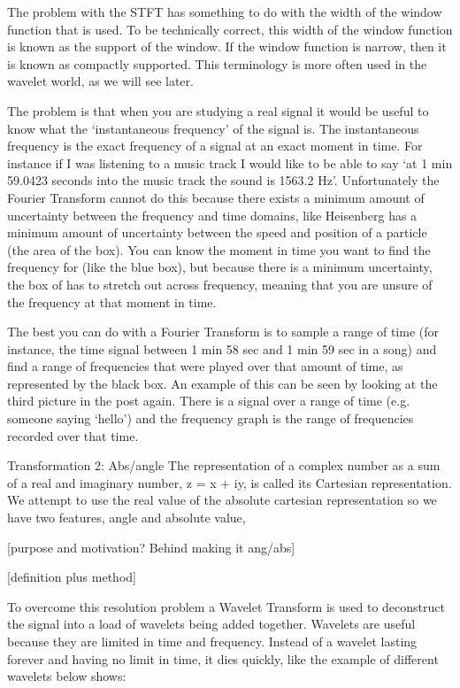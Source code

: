 \documentclass{turabian-thesis}
\begin{document}
The problem with the STFT has something to do with the width of the window function that is
used. To be technically correct, this width of the window function is known as the support of
the window. If the window function is narrow, then it is known as compactly supported. This
terminology is more often used in the wavelet world, as we will see later.

The problem is that when you are studying a real signal it would be useful to know what the ‘instantaneous frequency’ of the signal is. The instantaneous frequency is the exact frequency of a signal at an exact moment in time. For instance if I was listening to a music track I would like to be able to say ‘at 1 min 59.0423 seconds into the music track the sound is 1563.2 Hz’. Unfortunately the Fourier Transform cannot do this because there exists a minimum amount of uncertainty between the frequency and time domains, like Heisenberg has a minimum amount of uncertainty between the speed and position of a particle (the area of the box). You can know the moment in time you want to find the frequency for (like the blue box), but because there is a minimum uncertainty, the box of has to stretch out across frequency, meaning that you are unsure of the frequency at that moment in time.

The best you can do with a Fourier Transform is to sample a range of time (for instance, the time signal between 1 min 58 sec and 1 min 59 sec in a song) and find a range of frequencies that were played over that amount of time, as represented by the black box. An example of this can be seen by looking at the third picture in the post again. There is a signal over a range of time (e.g. someone saying ‘hello’) and the frequency graph is the range of frequencies recorded over that time.




Transformation 2: Abs/angle
The representation of a complex number as a sum of a real and imaginary number, z = x + iy, is called its Cartesian representation.
We attempt to use the real value of the absolute cartesian representation so we have two features, angle and absolute value, 

[purpose and motivation? Behind making it ang/abs]

[definition plus method]

To overcome this resolution problem a Wavelet Transform is used to deconstruct the signal into a load of wavelets being added together. Wavelets are useful because they are limited in time and frequency.  Instead of a wavelet lasting forever and having no limit in time, it dies quickly, like the example of different wavelets below shows:
\end{document}
